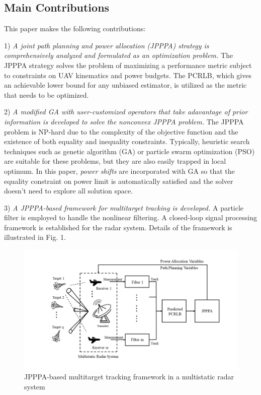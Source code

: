 \documentclass[12pt,journal,draftclsnofoot,onecolumn]{IEEEtran}
\begin{document}
\subsection{Main Contributions}
This paper makes the following contributions:

1) \emph{A joint path planning and power allocation (JPPPA) strategy is comprehensively analyzed and formulated as an optimization problem.} The JPPPA strategy solves the problem of maximizing a performance metric subject to constraints on UAV kinematics and power budgets. The PCRLB, which gives an achievable lower bound for any unbiased estimator, is utilized as the metric that needs to be optimized.

2) \emph{A modified GA with user-customized operators that take adavantage of prior information is developed to solve the nonconvex JPPPA problem.} The JPPPA problem is NP-hard %
due to the complexity of the objective function and the existence of both equality and inequality constraints. Typically, heuristic search techniques such as genetic algorithm (GA) or particle swarm optimization (PSO) are suitable for these problems, but they are also easily trapped in local optimum. In this paper, \emph{power shifts} are incorporated with GA so that the equality constraint on power limit is automatically satisfied and the solver doesn't need to explore all solution space.

3) \emph{A JPPPA-based framework for multitarget tracking is developed.} A particle filter is employed to handle the nonlinear filtering. A closed-loop signal processing framework is established for the radar system. Details of the framework is illustrated in Fig. 1.

\begin{figure}
	\centering
	\includegraphics[scale=0.28]{Flow Chart.jpg}
	\caption{JPPPA-based multitarget tracking framework in a multistatic radar system}
	\label{fig:system}
\end{figure}
\end{document}
